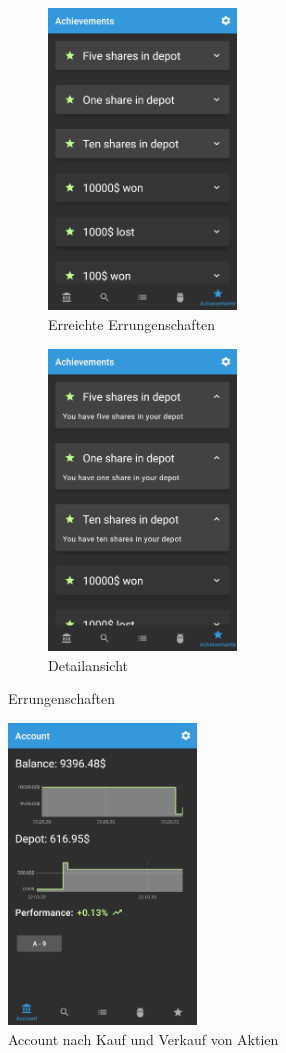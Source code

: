 \documentclass[a4paper]{article}
\begin{document}
\begin{figure}[H]
	\begin{subfigure}{.5\textwidth}
		\centering
		\includegraphics[height=8cm,keepaspectratio]{./images/demo/achievements_closed.png}
		\caption{Erreichte Errungenschaften}
		\label{fig:demo:achievements_closed}
	\end{subfigure}
	\begin{subfigure}{.5\textwidth}
		\centering
		\includegraphics[height=8cm,keepaspectratio]{./images/demo/achievements_open.png}
		\caption{Detailansicht}
		\label{fig:demo:achievements_open}
	\end{subfigure}
	\caption{Errungenschaften}
	\label{fig:demo:achievements}
\end{figure}

\begin{figure}[H]
	\centering
	\includegraphics[height=8cm,keepaspectratio]{./images/demo/end.png}
	\caption{Account nach Kauf und Verkauf von Aktien}
	\label{fig:demo:end}
\end{figure}
\end{document}
